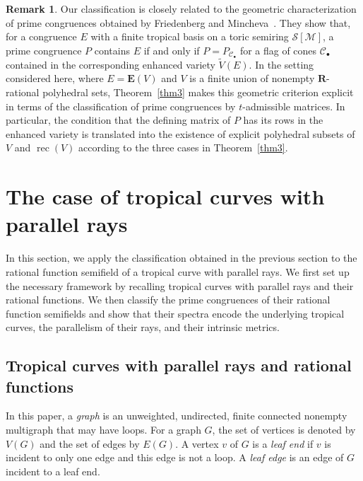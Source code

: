 \documentclass[a4paper,12pt]{amsart}
\theoremstyle{plain}
\theoremstyle{definition}
\newtheorem{remark}[theorem]{Remark}
\begin{document}
\begin{remark}
    \label{rem4}
Our classification is closely related to the geometric characterization of prime congruences obtained by Friedenberg and Mincheva~\cite[Theorem~1.1]{Friedenberg=Mincheva}.
They show that, for a congruence $E$ with a finite tropical basis on a toric semiring $\mathcal{S}[\mathcal{M}]$, a prime congruence $P$ contains $E$ if and only if $P=P_{\mathcal C_\bullet}$ for a flag of cones $\mathcal C_\bullet$ contained in the corresponding enhanced variety $\widetilde{V}(E)$.
In the setting considered here, where $E=\boldsymbol{E}(V)$ and $V$ is a finite union of nonempty $\boldsymbol{R}$-rational polyhedral sets, Theorem~\ref{thm3} makes this geometric criterion explicit in terms of the classification of prime congruences by $t$-admissible matrices.
In particular, the condition that the defining matrix of $P$ has its rows in the enhanced variety is translated into the existence of explicit polyhedral subsets of $V$ and $\operatorname{rec}(V)$ according to the three cases in Theorem~\ref{thm3}.
\end{remark}

\section{The case of tropical curves with parallel rays}
    \label{section5}

In this section, we apply the classification obtained in the previous section to the rational function semifield of a tropical curve with parallel rays.
We first set up the necessary framework by recalling tropical curves with parallel rays and their rational functions.
We then classify the prime congruences of their rational function semifields and show that their spectra encode the underlying tropical curves, the parallelism of their rays, and their intrinsic metrics.

\subsection{Tropical curves with parallel rays and rational functions}
    \label{subsection5.1}

In this paper, a \textit{graph} is an unweighted, undirected, finite connected nonempty multigraph that may have loops.
For a graph $G$, the set of vertices is denoted by $V(G)$ and the set of edges by $E(G)$.
A vertex $v$ of $G$ is a \textit{leaf end} if $v$ is incident to only one edge and this edge is not a loop.
A \textit{leaf edge} is an edge of $G$ incident to a leaf end.
\end{document}
